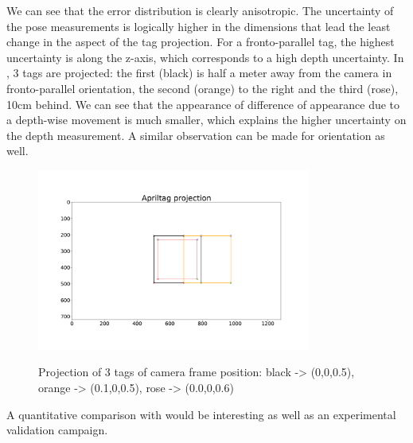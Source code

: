 We can see that the error distribution is clearly anisotropic. The uncertainty of the pose measurements
is logically higher in the dimensions that lead the least change in the aspect of the tag projection. For a fronto-parallel tag, the highest 
uncertainty is along the z-axis, which corresponds to a high depth uncertainty.
In , 3 tags are projected: the first (black) is half a meter away from the camera in fronto-parallel orientation, the second (orange)
to the right and the third (rose), 10cm behind. We can see that the appearance of difference of appearance due to a depth-wise movement is much smaller, which 
explains the higher uncertainty on the depth measurement. A similar observation can be made for orientation as well. 

\begin{figure}[h]
    \centering
    \includegraphics[width=0.8\textwidth]{figures/apriltag_proj.pdf}
    \label{fig:apriltag_proj}
    \caption{Projection of 3 tags of camera frame position: black -> (0,0,0.5), orange -> (0.1,0,0.5), rose -> (0.0,0,0.6)}
\end{figure}

A quantitative comparison with \cite{urban2016mlpnp} would be interesting as well as an experimental validation campaign.


